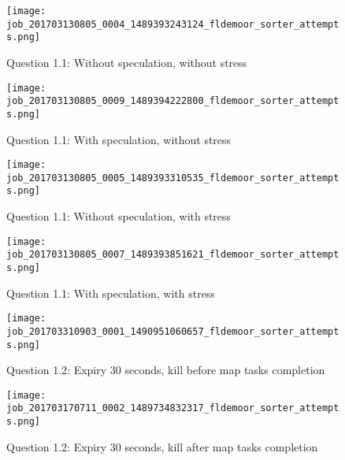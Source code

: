 
\begin{figure}[!ht]
    \centering
    \texttt{[image: job\_201703130805\_0004\_1489393243124\_fldemoor\_sorter\_attempts.png]}
    \caption{Question 1.1: Without speculation, without stress}
    \label{1.1.specOff.noStress}
\end{figure}
\newpage

\begin{figure}[!ht]
    \centering
    \texttt{[image: job\_201703130805\_0009\_1489394222800\_fldemoor\_sorter\_attempts.png]}
    \caption{Question 1.1: With speculation, without stress}
    \label{1.1.specOn.noStress}
\end{figure}

\begin{figure}[!ht]
    \centering
    \texttt{[image: job\_201703130805\_0005\_1489393310535\_fldemoor\_sorter\_attempts.png]}
    \caption{Question 1.1: Without speculation, with stress}
    \label{1.1.specOff.Stress}
\end{figure}
\newpage

\begin{figure}[!ht]
    \centering
    \texttt{[image: job\_201703130805\_0007\_1489393851621\_fldemoor\_sorter\_attempts.png]}
    \caption{Question 1.1: With speculation, with stress}
    \label{1.1.specOn.Stress}
\end{figure}
\newpage


\begin{figure}[!ht]
    \centering
    \texttt{[image: job\_201703310903\_0001\_1490951060657\_fldemoor\_sorter\_attempts.png]}
    \caption{Question 1.2: Expiry 30 seconds, kill before map tasks completion}
    \label{1.2.30s.map}
\end{figure}
\newpage

\begin{figure}[!ht]
    \centering
    \texttt{[image: job\_201703170711\_0002\_1489734832317\_fldemoor\_sorter\_attempts.png]}
    \caption{Question 1.2: Expiry 30 seconds, kill after map tasks completion}
    \label{1.2.30s.reduce}
\end{figure}
\newpage

